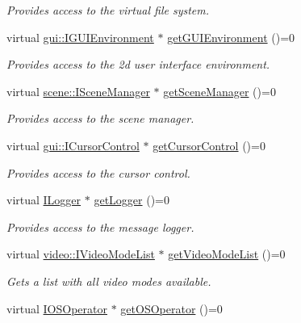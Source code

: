 \begin{DoxyCompactItemize}
\begin{DoxyCompactList}\small\item\em Provides access to the virtual file system. \end{DoxyCompactList}\item 
virtual \hyperlink{classirr_1_1gui_1_1IGUIEnvironment}{gui\+::\+I\+G\+U\+I\+Environment} $\ast$ \hyperlink{classirr_1_1IrrlichtDevice_af7491b8c5ef4f71360f30fbad90ae35c}{get\+G\+U\+I\+Environment} ()=0
\begin{DoxyCompactList}\small\item\em Provides access to the 2d user interface environment. \end{DoxyCompactList}\item 
virtual \hyperlink{classirr_1_1scene_1_1ISceneManager}{scene\+::\+I\+Scene\+Manager} $\ast$ \hyperlink{classirr_1_1IrrlichtDevice_a891b503ff4d5041296d88f23f97d7b3d}{get\+Scene\+Manager} ()=0
\begin{DoxyCompactList}\small\item\em Provides access to the scene manager. \end{DoxyCompactList}\item 
virtual \hyperlink{classirr_1_1gui_1_1ICursorControl}{gui\+::\+I\+Cursor\+Control} $\ast$ \hyperlink{classirr_1_1IrrlichtDevice_a500a3b7bf69487ff7e2075dd0b0db529}{get\+Cursor\+Control} ()=0
\begin{DoxyCompactList}\small\item\em Provides access to the cursor control. \end{DoxyCompactList}\item 
virtual \hyperlink{classirr_1_1ILogger}{I\+Logger} $\ast$ \hyperlink{classirr_1_1IrrlichtDevice_adec0b0b6b71b5066dd2c7039f1f4d85b}{get\+Logger} ()=0
\begin{DoxyCompactList}\small\item\em Provides access to the message logger. \end{DoxyCompactList}\item 
virtual \hyperlink{classirr_1_1video_1_1IVideoModeList}{video\+::\+I\+Video\+Mode\+List} $\ast$ \hyperlink{classirr_1_1IrrlichtDevice_a8872867a5ad728a4673679e9e8f469e7}{get\+Video\+Mode\+List} ()=0
\begin{DoxyCompactList}\small\item\em Gets a list with all video modes available. \end{DoxyCompactList}\item 
virtual \hyperlink{classirr_1_1IOSOperator}{I\+O\+S\+Operator} $\ast$ \hyperlink{classirr_1_1IrrlichtDevice_a3833250e8b0d7a94cd34b1e1809033ac}{get\+O\+S\+Operator} ()=0

\end{DoxyCompactItemize}
